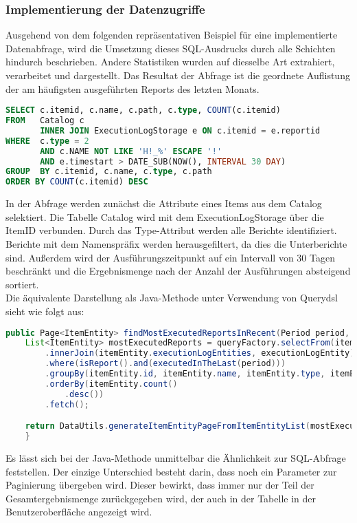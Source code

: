 \subsubsection{Implementierung der Datenzugriffe}
\label{sec:ImplementierungDatenzugriffe}
Ausgehend von dem folgenden repräsentativen Beispiel für eine implementierte Datenabfrage, wird die Umsetzung dieses SQL-Ausdrucks durch alle Schichten hindurch beschrieben. Andere Statistiken wurden auf diesselbe Art extrahiert, verarbeitet und dargestellt. Das Resultat der Abfrage ist die geordnete Auflistung der am häufigsten ausgeführten Reports des letzten Monats.
\begin{lstlisting}[language=SQL,caption={SQL-Abfrage}]
SELECT c.itemid, c.name, c.path, c.type, COUNT(c.itemid)
FROM   Catalog c 
       INNER JOIN ExecutionLogStorage e ON c.itemid = e.reportid 
WHERE  c.type = 2
       AND c.NAME NOT LIKE 'H!_%' ESCAPE '!'
       AND e.timestart > DATE_SUB(NOW(), INTERVAL 30 DAY)
GROUP  BY c.itemid, c.name, c.type, c.path 
ORDER BY COUNT(c.itemid) DESC
\end{lstlisting}
In der Abfrage werden zunächst die Attribute eines Items aus dem Catalog selektiert. Die Tabelle Catalog wird mit dem ExecutionLogStorage über die ItemID verbunden. Durch das Type-Attribut werden alle Berichte identifiziert. Berichte mit dem Namenspräfix  werden herausgefiltert, da dies die Unterberichte sind. Außerdem wird der Ausführungszeitpunkt auf ein Intervall von 30 Tagen beschränkt und die Ergebnismenge nach der Anzahl der Ausführungen absteigend sortiert.\\
Die äquivalente Darstellung als Java-Methode unter Verwendung von Querydsl sieht wie folgt aus:
\begin{lstlisting}[language=Java,caption={findMostExecutedReportsInRecent()},label=l:querydsl]
	public Page<ItemEntity> findMostExecutedReportsInRecent(Period period, Pageable pageable) {
    List<ItemEntity> mostExecutedReports = queryFactory.selectFrom(itemEntity)
        .innerJoin(itemEntity.executionLogEntities, executionLogEntity)
        .where(isReport().and(executedInTheLast(period)))
        .groupBy(itemEntity.id, itemEntity.name, itemEntity.type, itemEntity.path)
        .orderBy(itemEntity.count()
            .desc())
        .fetch();

    return DataUtils.generateItemEntityPageFromItemEntityList(mostExecutedReports, pageable);
  	}
\end{lstlisting}
Es lässt sich bei der Java-Methode unmittelbar die Ähnlichkeit zur SQL-Abfrage feststellen. Der einzige Unterschied besteht darin, dass noch ein Parameter zur Paginierung übergeben wird. Dieser bewirkt, dass immer nur der Teil der Gesamtergebnismenge zurückgegeben wird, der auch in der Tabelle in der Benutzeroberfläche angezeigt wird.

